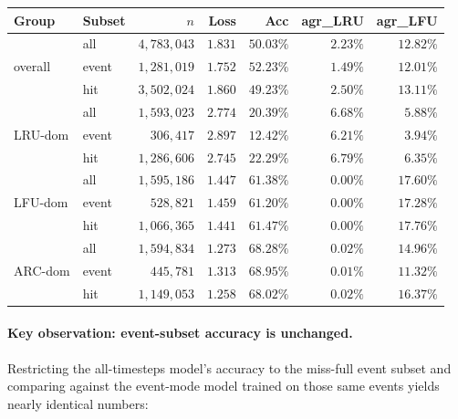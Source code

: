 \documentclass{article}
\begin{document}
\begin{center}
\small
\begin{tabular}{llrrrrr}
\toprule
Group & Subset & $n$ & Loss & Acc & agr\_LRU & agr\_LFU \\
\midrule
\multirow{3}{*}{overall} & all   & $4{,}783{,}043$ & $1.831$ & $50.03\%$ & $\phantom{0}2.23\%$ & $12.82\%$ \\
                         & event & $1{,}281{,}019$ & $1.752$ & $52.23\%$ & $\phantom{0}1.49\%$ & $12.01\%$ \\
                         & hit   & $3{,}502{,}024$ & $1.860$ & $49.23\%$ & $\phantom{0}2.50\%$ & $13.11\%$ \\
\midrule
\multirow{3}{*}{LRU-dom} & all   & $1{,}593{,}023$ & $2.774$ & $20.39\%$ & $\phantom{0}6.68\%$ & $\phantom{0}5.88\%$ \\
                         & event & $\phantom{0,}306{,}417$ & $2.897$ & $12.42\%$ & $\phantom{0}6.21\%$ & $\phantom{0}3.94\%$ \\
                         & hit   & $1{,}286{,}606$ & $2.745$ & $22.29\%$ & $\phantom{0}6.79\%$ & $\phantom{0}6.35\%$ \\
\midrule
\multirow{3}{*}{LFU-dom} & all   & $1{,}595{,}186$ & $1.447$ & $61.38\%$ & $\phantom{0}0.00\%$ & $17.60\%$ \\
                         & event & $\phantom{0,}528{,}821$ & $1.459$ & $61.20\%$ & $\phantom{0}0.00\%$ & $17.28\%$ \\
                         & hit   & $1{,}066{,}365$ & $1.441$ & $61.47\%$ & $\phantom{0}0.00\%$ & $17.76\%$ \\
\midrule
\multirow{3}{*}{ARC-dom} & all   & $1{,}594{,}834$ & $1.273$ & $68.28\%$ & $\phantom{0}0.02\%$ & $14.96\%$ \\
                         & event & $\phantom{0,}445{,}781$ & $1.313$ & $68.95\%$ & $\phantom{0}0.01\%$ & $11.32\%$ \\
                         & hit   & $1{,}149{,}053$ & $1.258$ & $68.02\%$ & $\phantom{0}0.02\%$ & $16.37\%$ \\
\bottomrule
\end{tabular}
\end{center}

\paragraph{Key observation: event-subset accuracy is unchanged.} Restricting
the all-timesteps model's accuracy to the miss-full event subset and
comparing against the event-mode model trained on those same events yields
nearly identical numbers:
\end{document}
